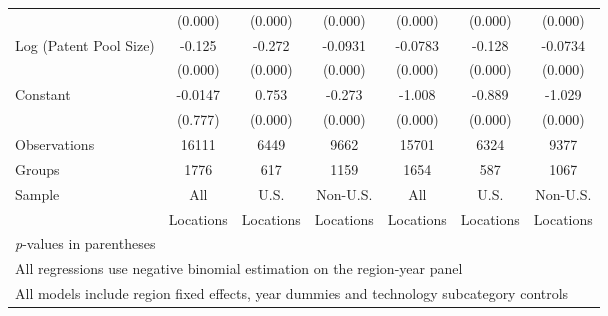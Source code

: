 \begin{table}[htbp]
\begin{tabular}{l*{6}{c}}
                &  (0.000)&  (0.000)&  (0.000)&  (0.000)&  (0.000)&  (0.000)\\
Log (Patent Pool Size)&   -0.125&   -0.272&  -0.0931&  -0.0783&   -0.128&  -0.0734\\
                &  (0.000)&  (0.000)&  (0.000)&  (0.000)&  (0.000)&  (0.000)\\
Constant        &  -0.0147&    0.753&   -0.273&   -1.008&   -0.889&   -1.029\\
                &  (0.777)&  (0.000)&  (0.000)&  (0.000)&  (0.000)&  (0.000)\\
\hline
Observations    &    16111&     6449&     9662&    15701&     6324&     9377\\
Groups          &     1776&      617&     1159&     1654&      587&     1067\\
Sample&All &U.S. &Non-U.S.&All &U.S. &Non-U.S. \\
          &Locations &Locations&Locations&Locations &Locations&Locations \\
\hline\hline
\multicolumn{7}{l}{\footnotesize \textit{p}-values in parentheses}\\
\multicolumn{7}{l}{\footnotesize All regressions use negative binomial estimation on the region-year panel}\\
\multicolumn{7}{l}{\footnotesize All models include region fixed effects, year dummies and technology subcategory controls}\\
\end{tabular}
\end{table}